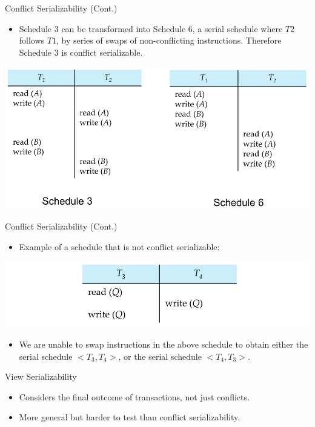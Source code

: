 \documentclass{beamer}
\begin{document}
\begin{frame}{Conflict Serializability (Cont.)}
    \begin{itemize}
        \item Schedule 3 can be transformed into Schedule 6, a serial schedule where $T2$ follows $T1$, by series of swaps of non-conflicting instructions. Therefore Schedule 3 is conflict serializable.
    \end{itemize}
    \centering
    \includegraphics[width=.9\textwidth]{figures/conflict_ser1}
\end{frame}

\begin{frame}{Conflict Serializability (Cont.)}
    \begin{itemize}
        \item Example of a schedule that is not conflict serializable:
    \end{itemize}
    \centering
    \includegraphics[width=.9\textwidth]{figures/conflict_ser2}
    \begin{itemize}
        \item We are unable to swap instructions in the above schedule to obtain either the serial schedule $< T_3, T_4 >$, or the serial schedule $< T_4, T_3 >$.
    \end{itemize}
\end{frame}

\begin{frame}{View Serializability}
    \begin{itemize}
        \item Considers the final outcome of transactions, not just conflicts.
        \item More general but harder to test than conflict serializability.
    \end{itemize}
\end{frame}
\end{document}
